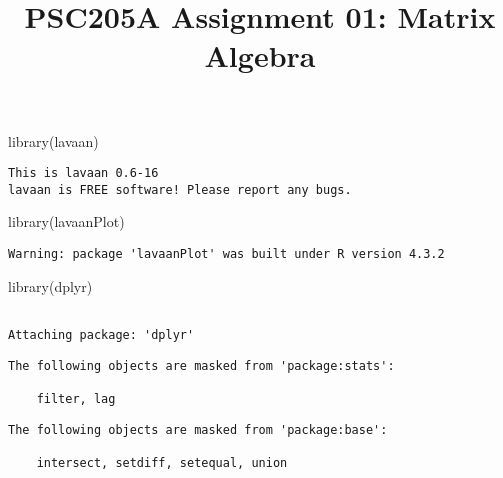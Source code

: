 \documentclass[
  letterpaper,
  DIV=11,
  numbers=noendperiod]{scrartcl}
\title{PSC205A Assignment 01: Matrix Algebra}
\author{}
\date{}
\newenvironment{Shaded}{\begin{snugshade}}{\end{snugshade}}
\newcommand{\FunctionTok}[1]{\textcolor[rgb]{0.28,0.35,0.67}{#1}}
\newcommand{\NormalTok}[1]{\textcolor[rgb]{0.00,0.23,0.31}{#1}}
\begin{document}
\maketitle

\begin{Shaded}
\begin{Highlighting}[]
\FunctionTok{library}\NormalTok{(lavaan)}
\end{Highlighting}
\end{Shaded}

\begin{verbatim}
This is lavaan 0.6-16
lavaan is FREE software! Please report any bugs.
\end{verbatim}

\begin{Shaded}
\begin{Highlighting}[]
\FunctionTok{library}\NormalTok{(lavaanPlot)}
\end{Highlighting}
\end{Shaded}

\begin{verbatim}
Warning: package 'lavaanPlot' was built under R version 4.3.2
\end{verbatim}

\begin{Shaded}
\begin{Highlighting}[]
\FunctionTok{library}\NormalTok{(dplyr)}
\end{Highlighting}
\end{Shaded}

\begin{verbatim}

Attaching package: 'dplyr'
\end{verbatim}

\begin{verbatim}
The following objects are masked from 'package:stats':

    filter, lag
\end{verbatim}

\begin{verbatim}
The following objects are masked from 'package:base':

    intersect, setdiff, setequal, union
\end{verbatim}
\end{document}
